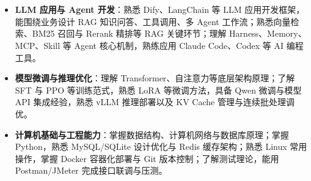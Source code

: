 \documentclass[10pt]{article}
\begin{document}
    \ResumeContactBar
    \ResumeProfileAndEducation


    \section[专业技能]{}
    \begin{itemize}
        \item \textbf{LLM 应用与 Agent 开发}：熟悉 Dify、LangChain 等 LLM 应用开发框架，能围绕业务设计 RAG 知识问答、工具调用、多 Agent 工作流；熟悉向量检索、BM25 召回与 Rerank 精排等 RAG 关键环节；理解 Harness、Memory、MCP、Skill 等 Agent 核心机制，熟练应用 Claude Code、Codex 等 AI 编程工具。
        \item \textbf{模型微调与推理优化}：理解 Transformer、自注意力等底层架构原理；了解 SFT 与 PPO 等训练范式，熟悉 LoRA 等微调方法，具备 Qwen 微调与模型 API 集成经验，熟悉 vLLM 推理部署以及 KV Cache 管理与连续批处理调优。
        \item \textbf{计算机基础与工程能力}：掌握数据结构、计算机网络与数据库原理；掌握 Python，熟悉 MySQL/SQLite 设计优化与 Redis 缓存架构；熟悉 Linux 常用操作，掌握 Docker 容器化部署与 Git 版本控制；了解测试理论，能用 Postman/JMeter 完成接口联调与压测。
    \end{itemize}


    \section[实习经历]{}
\end{document}
